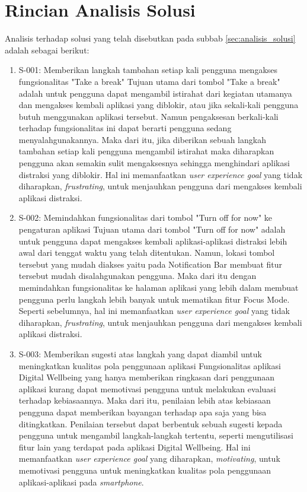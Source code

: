 \chapter{Rincian Analisis Solusi}
\label{chpt:rincian_analisis_solusi}

Analisis terhadap solusi yang telah disebutkan pada subbab \ref{sec:analisis_solusi} adalah sebagai berikut:

\begin{enumerate}
  \item S-001: Memberikan langkah tambahan setiap kali pengguna mengakses fungsionalitas "Take a break"
  \subitem
  Tujuan utama dari tombol "Take a break" adalah untuk pengguna dapat mengambil istirahat dari kegiatan utamanya dan mengakses kembali aplikasi yang diblokir, atau jika sekali-kali pengguna butuh menggunakan aplikasi tersebut. Namun pengaksesan berkali-kali terhadap fungsionalitas ini dapat berarti pengguna sedang menyalahgunakannya. Maka dari itu, jika diberikan sebuah langkah tambahan setiap kali pengguna mengambil istirahat maka diharapkan pengguna akan semakin sulit mengaksesnya sehingga menghindari aplikasi distraksi yang diblokir. Hal ini memanfaatkan \textit{user experience goal} yang tidak diharapkan, \textit{frustrating}, untuk menjauhkan pengguna dari mengakses kembali aplikasi distraksi.
  
  \item S-002: Memindahkan fungsionalitas dari tombol "Turn off for now" ke pengaturan aplikasi
  \subitem
  Tujuan utama dari tombol "Turn off for now" adalah untuk pengguna dapat mengakses kembali aplikasi-aplikasi distraksi lebih awal dari tenggat waktu yang telah ditentukan. Namun, lokasi tombol tersebut yang mudah diakses yaitu pada Notification Bar membuat fitur tersebut mudah disalahgunakan pengguna. Maka dari itu dengan memindahkan fungsionalitas ke halaman aplikasi yang lebih dalam membuat pengguna perlu langkah lebih banyak untuk mematikan fitur Focus Mode. Seperti sebelumnya, hal ini memanfaatkan \textit{user experience goal} yang tidak diharapkan, \textit{frustrating}, untuk menjauhkan pengguna dari mengakses kembali aplikasi distraksi. 
  
  \item S-003: Memberikan sugesti atas langkah yang dapat diambil untuk meningkatkan kualitas pola penggunaan aplikasi
  \subitem Fungsionalitas aplikasi Digital Wellbeing yang hanya memberikan ringkasan dari penggunaan aplikasi kurang dapat memotivasi pengguna untuk melakukan evaluasi terhadap kebiasaannya. Maka dari itu, penilaian lebih atas kebiasaan pengguna dapat memberikan bayangan terhadap apa saja yang bisa ditingkatkan. Penilaian tersebut dapat berbentuk sebuah sugesti kepada pengguna untuk mengambil langkah-langkah tertentu, seperti mengutilisasi fitur lain yang terdapat pada aplikasi Digital Wellbeing. Hal ini memanfaatkan \textit{user experience goal} yang diharapkan, \textit{motivating}, untuk memotivasi pengguna untuk meningkatkan kualitas pola penggunaan aplikasi-aplikasi pada \textit{smartphone}.

\end{enumerate}